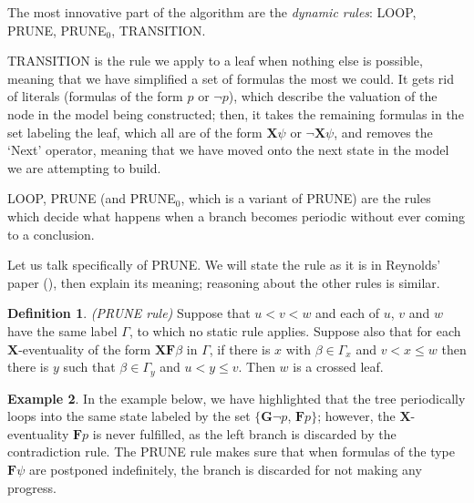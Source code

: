 \documentclass[11pt]{article}
\newcommand{\X}{{\mathbf{X}}}
\newcommand{\F}{{\mathbf{F}}}
\newcommand{\andd}{{\wedge}}
\newcommand{\G}{{\mathbf{G}}}
\theoremstyle{definition}
\newtheorem{definition}{Definition}
\newtheorem{example}[definition]{Example}
\begin{document}
The most innovative part of the algorithm are the \emph{dynamic rules}: LOOP, PRUNE, {PRUNE}$_0$, TRANSITION.

TRANSITION is the rule we apply to a leaf when nothing else is possible, meaning that we have simplified a set of formulas the most we could. It gets 
rid of literals (formulas of the form $p$ or $\neg p$), which describe the valuation of the node in the model being constructed; then,
it takes the remaining formulas in the set labeling the leaf, which all are of the form $\X\psi$ or $\neg\X\psi$, and removes the `Next' operator,
meaning that we have moved onto the next state in the model we are attempting to build.

LOOP, PRUNE (and {PRUNE}$_0$, which is a variant of PRUNE) are the rules which decide what happens when a branch becomes periodic without ever 
coming to a conclusion.

Let us talk specifically of PRUNE.
We will state the rule as it is in Reynolds' paper (\cite{ReyLTL}), then explain its meaning; reasoning about the other rules is similar.

\begin{definition}\label{prune_rule}
    \emph{(PRUNE rule)}
    Suppose that $u < v < w$ and each of $u$, $v$ and $w$ have the same
    label $\Gamma$, to which no static rule applies. Suppose also that for each $\X$-eventuality of the form $\X\F\beta$ in $\Gamma$, if there is $x$ with
    $\beta \in \Gamma_x$ and $v < x \leq w$ then there is $y$ such that $\beta\in\Gamma_y$ and $u < y \leq v$. Then $w$ is a
    crossed leaf.
\end{definition}

\begin{example}\label{prune_ex}
In the example below, we have highlighted that the tree periodically loops into the same state labeled by the set $\{\G\neg p$, $\F p\}$;
however, the $\X$-eventuality $\F p$ is never fulfilled, as the left branch is discarded by the contradiction rule. The PRUNE rule
makes sure that when formulas of the type $\F\psi$ are postponed indefinitely, the branch is discarded for not making any progress.

\begin{center} 
\end{center}
\end{example}
\end{document}

